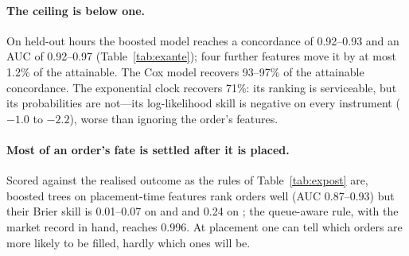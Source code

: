 \paragraph{The ceiling is below one.}
On held-out hours the boosted model reaches a concordance of 0.92--0.93 and an
AUC of 0.92--0.97 (Table~\ref{tab:exante}); four further features move it by at
most 1.2\% of the attainable. The Cox model recovers 93--97\% of the attainable
concordance. The exponential clock recovers 71\%: its ranking is serviceable,
but its probabilities are not---its log-likelihood skill is negative on every
instrument ($-1.0$ to $-2.2$), worse than ignoring the order's features.

\paragraph{Most of an order's fate is settled after it is placed.}
Scored against the realised outcome as the rules of Table~\ref{tab:expost} are,
boosted trees on placement-time features rank orders well (AUC 0.87--0.93) but
their Brier skill is 0.01--0.07 on \ETH{} and \SOL{} and 0.24 on \BTC; the
queue-aware rule, with the market record in hand, reaches 0.996. At placement one
can tell which orders are more likely to be filled, hardly which ones will be.
